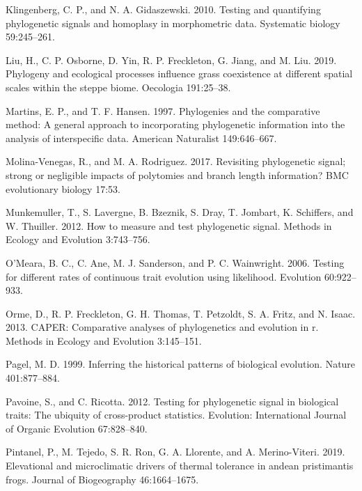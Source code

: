 \documentclass[
]{article}
\begin{document}
\leavevmode\hypertarget{ref-Klingenberg2010}{}%
Klingenberg, C. P., and N. A. Gidaszewski. 2010. Testing and quantifying
phylogenetic signals and homoplasy in morphometric data. Systematic
biology 59:245--261.

\leavevmode\hypertarget{ref-Liu2019}{}%
Liu, H., C. P. Osborne, D. Yin, R. P. Freckleton, G. Jiang, and M. Liu.
2019. Phylogeny and ecological processes influence grass coexistence at
different spatial scales within the steppe biome. Oecologia 191:25--38.

\leavevmode\hypertarget{ref-MartinsHansen1997}{}%
Martins, E. P., and T. F. Hansen. 1997. Phylogenies and the comparative
method: A general approach to incorporating phylogenetic information
into the analysis of interspecific data. American Naturalist
149:646--667.

\leavevmode\hypertarget{ref-MolinaVenegas2017}{}%
Molina-Venegas, R., and M. A. Rodriguez. 2017. Revisiting phylogenetic
signal; strong or negligible impacts of polytomies and branch length
information? BMC evolutionary biology 17:53.

\leavevmode\hypertarget{ref-Munkemuller_et_al2012}{}%
Munkemuller, T., S. Lavergne, B. Bzeznik, S. Dray, T. Jombart, K.
Schiffers, and W. Thuiller. 2012. How to measure and test phylogenetic
signal. Methods in Ecology and Evolution 3:743--756.

\leavevmode\hypertarget{ref-OMeara_et_al2006}{}%
O'Meara, B. C., C. Ane, M. J. Sanderson, and P. C. Wainwright. 2006.
Testing for different rates of continuous trait evolution using
likelihood. Evolution 60:922--933.

\leavevmode\hypertarget{ref-Orme2013}{}%
Orme, D., R. P. Freckleton, G. H. Thomas, T. Petzoldt, S. A. Fritz, and
N. Isaac. 2013. CAPER: Comparative analyses of phylogenetics and
evolution in r. Methods in Ecology and Evolution 3:145--151.

\leavevmode\hypertarget{ref-Pagel1999}{}%
Pagel, M. D. 1999. Inferring the historical patterns of biological
evolution. Nature 401:877--884.

\leavevmode\hypertarget{ref-Pavoine2012}{}%
Pavoine, S., and C. Ricotta. 2012. Testing for phylogenetic signal in
biological traits: The ubiquity of cross-product statistics. Evolution:
International Journal of Organic Evolution 67:828--840.

\leavevmode\hypertarget{ref-Pintanel2019}{}%
Pintanel, P., M. Tejedo, S. R. Ron, G. A. Llorente, and A.
Merino-Viteri. 2019. Elevational and microclimatic drivers of thermal
tolerance in andean pristimantis frogs. Journal of Biogeography
46:1664--1675.
\end{document}
